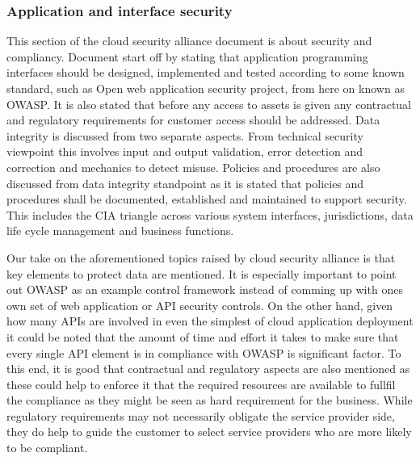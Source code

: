 \documentclass{article}
\begin{document}
\subsubsection{Application and interface security}
This section of the cloud security alliance document is about security and compliancy. Document start off by stating that application programming interfaces should be designed, implemented and tested according to some known standard, such as Open web application security project, from here on known as OWASP. It is also stated that before any access to assets is given any contractual and regulatory requirements for customer access should be addressed.
Data integrity is discussed from two separate aspects. From technical security viewpoint this involves input and output validation, error detection and correction and mechanics to detect misuse. Policies and procedures are also discussed from data integrity standpoint as it is stated that policies and procedures shall be documented, established and maintained to support security. This includes the CIA triangle across various system interfaces, jurisdictions, data life cycle management and business functions.
\par
Our take on the aforementioned topics raised by cloud security alliance is that key elements to protect data are mentioned. It is especially important to point out OWASP as an example control framework instead of comming up with ones own set of web application or API security controls. On the other hand, given how many APIs are involved in even the simplest of cloud application deployment it could be noted that the amount of time and effort it takes to make sure that every single API element is in compliance with OWASP is significant factor. To this end, it is good that contractual and regulatory aspects are also mentioned as these could help to enforce it that the required resources are available to fullfil the compliance as they might be seen as hard requirement for the business. While regulatory requirements may not necessarily obligate the service provider side, they do help to guide the customer to select service providers who are more likely to be compliant. 
\end{document}
